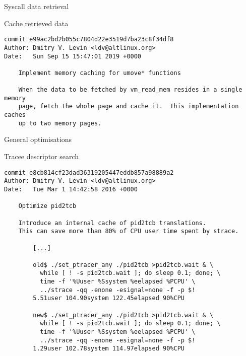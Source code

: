 \documentclass[unicode]{beamer}
\begin{document}
\begin{frame}[fragile]{Syscall data retrieval}
\begin{block}{\large Cache retrieved data}
\begin{scriptsize}
\begin{verbatim}
commit e99ac2bd2b055c7804d22e3519d7ba23c8f34df8
Author: Dmitry V. Levin <ldv@altlinux.org>
Date:   Sun Sep 15 15:47:01 2019 +0000

    Implement memory caching for umove* functions
    
    When the data to be fetched by vm_read_mem resides in a single memory
    page, fetch the whole page and cache it.  This implementation caches
    up to two memory pages.
\end{verbatim}
\end{scriptsize}
\end{block}
\end{frame}

\begin{frame}[fragile]{General optimisations}
\begin{block}{\large Tracee descriptor search}
\begin{scriptsize}
\begin{verbatim}
commit e8cb814cf23dad36319205447eddb857a98889a2
Author: Dmitry V. Levin <ldv@altlinux.org>
Date:   Tue Mar 1 14:42:58 2016 +0000

    Optimize pid2tcb
    
    Introduce an internal cache of pid2tcb translations.
    This can save more than 80% of CPU user time spent by strace.
    
        [...]
    
        old$ ./set_ptracer_any ./pid2tcb >pid2tcb.wait & \
          while [ ! -s pid2tcb.wait ]; do sleep 0.1; done; \
          time -f '%Uuser %Ssystem %eelapsed %PCPU' \
          ../strace -qq -enone -esignal=none -f -p $!
        5.51user 104.90system 122.45elapsed 90%CPU
    
        new$ ./set_ptracer_any ./pid2tcb >pid2tcb.wait & \
          while [ ! -s pid2tcb.wait ]; do sleep 0.1; done; \
          time -f '%Uuser %Ssystem %eelapsed %PCPU' \
          ../strace -qq -enone -esignal=none -f -p $!
        1.29user 102.78system 114.97elapsed 90%CPU
\end{verbatim}
\end{scriptsize}
\end{block}
\end{frame}
\end{document}
